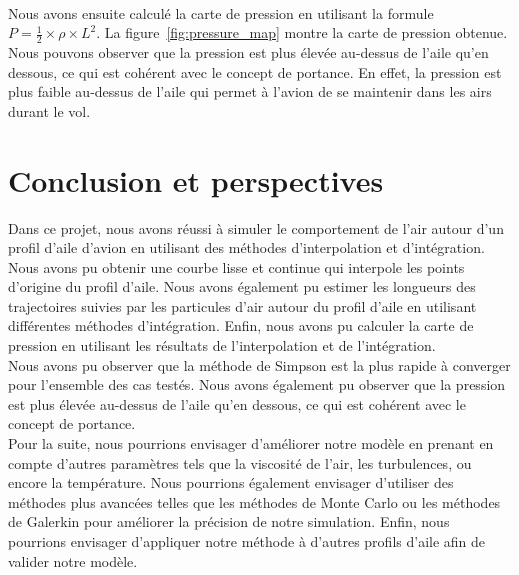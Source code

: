 \documentclass{article}
\begin{document}
\phantom{text}\\
Nous avons ensuite calculé la carte de pression en utilisant la formule $P = \frac{1}{2} \times \rho \times L^2$. La figure~\ref{fig:pressure_map} montre la carte de pression obtenue. Nous pouvons observer que la pression est plus élevée au-dessus de l'aile qu'en dessous, ce qui est cohérent avec le concept de portance. En effet, la pression est plus faible au-dessus de l'aile qui permet à l'avion de se maintenir dans les airs durant le vol.

\section{Conclusion et perspectives}
Dans ce projet, nous avons réussi à simuler le comportement de l'air autour d'un profil d'aile d'avion en utilisant des méthodes d'interpolation et d'intégration. Nous avons pu obtenir une courbe lisse et continue qui interpole les points d'origine du profil d'aile. Nous avons également pu estimer les longueurs des trajectoires suivies par les particules d'air autour du profil d'aile en utilisant différentes méthodes d'intégration. Enfin, nous avons pu calculer la carte de pression en utilisant les résultats de l'interpolation et de l'intégration.\\
Nous avons pu observer que la méthode de Simpson est la plus rapide à converger pour l'ensemble des cas testés. Nous avons également pu observer que la pression est plus élevée au-dessus de l'aile qu'en dessous, ce qui est cohérent avec le concept de portance.\\

Pour la suite, nous pourrions envisager d'améliorer notre modèle en prenant en compte d'autres paramètres tels que la viscosité de l'air, les turbulences, ou encore la température. Nous pourrions également envisager d'utiliser des méthodes plus avancées telles que les méthodes de Monte Carlo ou les méthodes de Galerkin pour améliorer la précision de notre simulation. Enfin, nous pourrions envisager d'appliquer notre méthode à d'autres profils d'aile afin de valider notre modèle.







\end{document}
